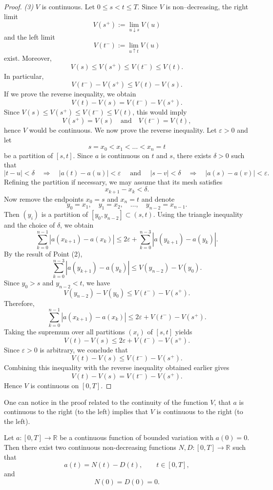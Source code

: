 \documentclass[10pt]{report}
\newcommand{\R}{\mathbb{R}}
\begin{document}
\begin{proof}
	\medskip

	\emph{(3)} $V$ is continuous. Let $0 \le s < t \le T$. Since $V$ is non–decreasing, the right limit
	\[
		V(s^+) := \lim_{u \downarrow s} V(u)
	\]
	and the left limit
	\[
		V(t^-) := \lim_{u \uparrow t} V(u)
	\]
	exist.
	Moreover,
	\[
		V(s) \le V(s^+) \le V(t^-) \le V(t).
	\]
	In particular,
	\[
		V(t^-) - V(s^+) \le V(t) - V(s).
	\]
	If we prove the reverse inequality, we obtain
	\[
		V(t)-V(s)=V(t^-)-V(s^+).
	\]
	Since $V(s)\le V(s^+)\le V(t^-)\le V(t)$, this would imply
	\[
		V(s^+)=V(s) \quad \text{and} \quad V(t^-)=V(t),
	\]
	hence $V$ would be continuous.
	We now prove the reverse inequality.
	Let $\varepsilon>0$ and let
	\[
		s=x_0 < x_1 < \dots < x_n=t
	\]
	be a partition of $[s,t]$.
	Since $a$ is continuous on $t$ and $s$, there exists $\delta>0$ such that
	\[
		|t-u|<\delta \quad \Longrightarrow \quad |a(t)-a(u)|<\varepsilon
		\quad \text{ and }\quad
		|s-v|<\delta \quad \Longrightarrow \quad |a(s)-a(v)|<\varepsilon .
	\]
	Refining the partition if necessary, we may assume that its mesh satisfies
	\[
		x_{k+1}-x_k<\delta .
	\]
	Now remove the endpoints $x_0=s$ and $x_n=t$ and denote
	\[
		y_0=x_1,\quad y_1=x_2,\quad \dots,\quad y_{n-2}=x_{n-1}.
	\]
	Then $(y_i)$ is a partition of $[y_0,y_{n-2}] \subset (s,t)$.
	Using the triangle inequality and the choice of $\delta$, we obtain
	\[
		\sum_{k=0}^{n-1}|a(x_{k+1})-a(x_k)|
		\le
		2\varepsilon + \sum_{k=0}^{n-3}|a(y_{k+1})-a(y_k)|.
	\]
	By the result of Point (2),
	\[
		\sum_{k=0}^{n-3}|a(y_{k+1})-a(y_k)|
		\le V(y_{n-2})-V(y_0).
	\]
	Since $y_0>s$ and $y_{n-2}<t$, we have
	\[
		V(y_{n-2})-V(y_0)\le V(t^-)-V(s^+).
	\]
	Therefore,
	\[
		\sum_{k=0}^{n-1}|a(x_{k+1})-a(x_k)|
		\le
		2\varepsilon + V(t^-)-V(s^+).
	\]
	Taking the supremum over all partitions $(x_i)$ of $[s,t]$ yields
	\[
		V(t)-V(s)\le 2\varepsilon + V(t^-)-V(s^+).
	\]
	Since $\varepsilon>0$ is arbitrary, we conclude that
	\[
		V(t)-V(s)\le V(t^-)-V(s^+).
	\]
	Combining this inequality with the reverse inequality obtained earlier gives
	\[
		V(t)-V(s)=V(t^-)-V(s^+).
	\]
	Hence $V$ is continuous on $[0,T]$.

\end{proof}

\rem
\label{rem:cont}
One can notice in the proof related to the continuity of the function $V$, that
$a$ is continuous to the right (to the left) implies that $V$ is continuous to the right (to the left).

\label{lem:jordan-cont}
Let $a:[0,T]\to\R$ be a continuous function of bounded variation with $a(0)=0$.
Then there exist two continuous non-decreasing functions $N,D:[0,T]\to\R$
such that
\[
	a(t)=N(t)-D(t), \qquad t\in[0,T],
\]
and
\[
	N(0)=D(0)=0.
\]
\end{document}
